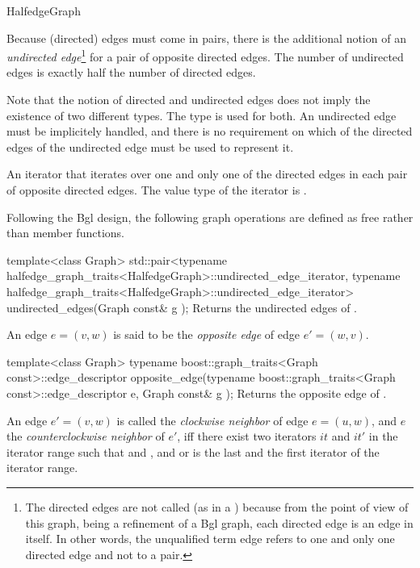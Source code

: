 \begin{ccRefConcept}{HalfedgeGraph}




Because (directed) edges must come in pairs, there is the additional
notion of an {\em undirected edge}\footnote{
The directed edges are not called  (as in a
) because from the point of view of this graph, being
a refinement of a {\sc Bgl} graph, each directed edge is an
edge in itself. In other words, the unqualified term edge
refers to one and only one directed edge and not to a pair.}
% 
for a pair of opposite directed edges.
The number of undirected edges is exactly half the number of directed edges.

 
Note that the notion of directed and undirected edges does not imply
the existence of two different types.  The type 
is used for both.  An undirected edge must be implicitely handled, and
there is no requirement on which of the directed edges of the undirected edge
must be used to represent it.



  {An iterator that iterates over one and only one of the directed edges
  in each pair of opposite directed edges. The value type of the iterator 
  is .}{}



Following the {\sc Bgl} design, the following graph operations are defined as free rather than member functions.

  \ccFunction
  {template<class Graph>
  std::pair<typename halfedge_graph_traits<HalfedgeGraph>::undirected_edge_iterator,
            typename halfedge_graph_traits<HalfedgeGraph>::undirected_edge_iterator>
  undirected_edges(Graph const& g );
  }
  {Returns the undirected edges of .}


An edge $e=(v,w)$ is said to be the {\em opposite edge} of edge $e'=(w,v)$.

  \ccFunction
  {template<class Graph>
  typename boost::graph_traits<Graph const>::edge_descriptor 
  opposite_edge(typename boost::graph_traits<Graph const>::edge_descriptor e, Graph const& g );
  }
  {Returns the opposite edge of .}
  
An edge $e'=(v,w)$ is called the {\em clockwise neighbor} of edge
$e=(u,w)$, and $e$ the {\em counterclockwise neighbor} of $e'$, iff there
exist two iterators $it$ and $it'$ in the iterator range
 such that  and ,
and  or  is the last and  the first
iterator of the iterator range.
 


\end{ccRefConcept}
